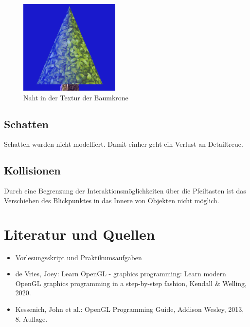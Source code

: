 \documentclass{scrartcl}
\begin{document}
\begin{figure}[h]
 \centering
 \includegraphics[width=5cm]{4.png}
 \caption{Naht in der Textur der Baumkrone}
\end{figure}



\subsection{Schatten}

Schatten wurden nicht modelliert. Damit einher geht ein Verlust an Detailtreue.

\subsection{Kollisionen}

Durch eine Begrenzung der Interaktionsmöglichkeiten über die Pfeiltasten ist das Verschieben des Blickpunktes in das Innere von Objekten nicht möglich.

\section{Literatur und Quellen}

\begin{itemize}
	\item Vorlesungsskript und Praktikumsaufgaben
	\item de Vries, Joey: Learn OpenGL - graphics programming: Learn modern OpenGL graphics programming in a step-by-step fashion, Kendall \& Welling, 2020.
	\item Kessenich,  John et al.: OpenGL Programming Guide, Addison Wesley, 2013, 8. Auflage.
\end{itemize}
\end{document}
